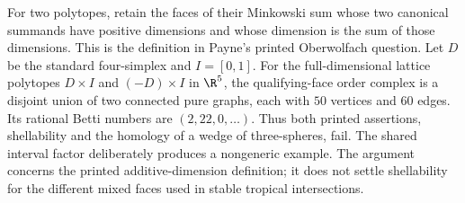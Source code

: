 
For two polytopes, retain the faces of their Minkowski sum whose two
canonical summands have positive dimensions and whose dimension is the
sum of those dimensions. This is the definition in Payne's printed
Oberwolfach question. Let $D$ be the standard four-simplex and $I=[0,1]$.
For the full-dimensional lattice polytopes $D\times I$ and $(-D)\times I$
in $\R^5$, the qualifying-face order complex is a disjoint union of two
connected pure graphs, each with $50$ vertices and $60$ edges. Its
rational Betti numbers are $(2,22,0,\ldots)$. Thus both printed
assertions, shellability and the homology of a wedge of three-spheres,
fail. The shared interval factor deliberately produces a nongeneric
example. The argument concerns the printed additive-dimension
definition; it does not settle shellability for the different mixed
faces used in stable tropical intersections.
